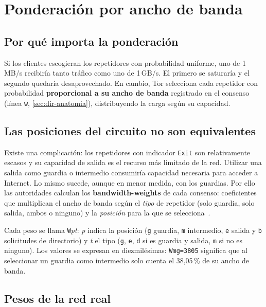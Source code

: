 \section{Ponderación por ancho de banda}\label{sec:percorso-pesi}

\subsection{Por qué importa la ponderación}

Si los clientes escogieran los repetidores con probabilidad uniforme, uno de 1\,MB/s recibiría tanto tráfico como uno de 1\,GB/s. El primero se saturaría y el segundo quedaría desaprovechado. En cambio, Tor selecciona cada repetidor con probabilidad \textbf{proporcional a su ancho de banda} registrado en el consenso (línea \texttt{w}, \cref{sec:dir-anatomia}), distribuyendo la carga según su capacidad.

\subsection{Las posiciones del circuito no son equivalentes}

Existe una complicación: los repetidores con indicador \texttt{Exit} son relativamente escasos y su capacidad de salida es el recurso más limitado de la red. Utilizar una salida como guardia o intermedio consumiría capacidad necesaria para acceder a Internet. Lo mismo sucede, aunque en menor medida, con los guardias. Por ello las autoridades calculan los \textbf{bandwidth-weights} de cada consenso: coeficientes que multiplican el ancho de banda según el \emph{tipo} de repetidor (solo guardia, solo salida, ambos o ninguno) y la \emph{posición} para la que se selecciona~.

Cada peso se llama \texttt{W}\emph{pt}: \emph{p} indica la posición (\texttt{g} guardia, \texttt{m} intermedio, \texttt{e} salida y \texttt{b} solicitudes de directorio) y \emph{t} el tipo (\texttt{g}, \texttt{e}, \texttt{d} si es guardia y salida, \texttt{m} si no es ninguno). Los valores se expresan en diezmilésimas: \texttt{Wmg=3805} significa que al seleccionar un guardia como intermedio solo cuenta el 38,05\,\% de su ancho de banda.

\subsection{Pesos de la red real}

